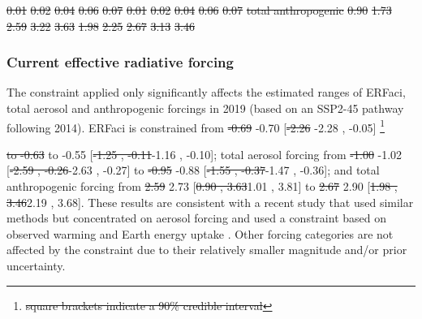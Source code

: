 \documentclass[gmd, manuscript]{copernicus}
\providecommand{\DIFadd}[1]{{\protect\color{blue}#1}} %
\providecommand{\DIFdel}[1]{{\protect\color{red}\sout{#1}}}                      %
\providecommand{\DIFaddbegin}{} %
\providecommand{\DIFaddend}{} %
\providecommand{\DIFdelbegin}{} %
\providecommand{\DIFdelend}{} %
\providecommand{\DIFdelFL}[1]{\DIFdel{#1}} %
\providecommand{\DIFaddbeginFL}{} %
\providecommand{\DIFdelendFL}{} %
\begin{document}
\begin{table}[t]
\DIFdelFL{0.01 }%
\DIFdelFL{0.02 }%
\DIFdelFL{0.04 }%
\DIFdelFL{0.06 }%
\DIFdelFL{0.07 }%
\DIFdelFL{0.01 }%
\DIFdelFL{0.02 }%
\DIFdelFL{0.04 }%
\DIFdelFL{0.06 }%
\DIFdelFL{0.07 }%
\DIFdelFL{total anthropogenic         }%
\DIFdelFL{0.90 }%
\DIFdelFL{1.73 }%
\DIFdelFL{2.59 }%
\DIFdelFL{3.22 }%
\DIFdelFL{3.63 }%
\DIFdelFL{1.98 }%
\DIFdelFL{2.25 }%
\DIFdelFL{2.67 }%
\DIFdelFL{3.13 }%
\DIFdelFL{3.46 }%
\DIFdelendFL \DIFaddbeginFL \end{table}
\clearpage
\DIFaddend \subsubsection{Current effective radiative forcing}
The constraint applied only significantly affects the estimated ranges of ERFaci, total aerosol and anthropogenic forcings in 2019 (based on an SSP2-45 pathway following 2014). ERFaci is constrained from \DIFdelbegin \DIFdel{-0.69 }\DIFdelend \DIFaddbegin \DIFadd{-0.70 }\DIFaddend [\DIFdelbegin \DIFdel{-2.26 }\DIFdelend \DIFaddbegin \DIFadd{-2.28 }\DIFaddend , -0.05] \DIFdelbegin \footnote{\DIFdel{square brackets indicate a 90\% credible interval}} %
\addtocounter{footnote}{-1}%
\DIFdel{to -0.63 }\DIFdelend \DIFaddbegin \DIFadd{to -0.55 }\DIFaddend [\DIFdelbegin \DIFdel{-1.25 , -0.11}\DIFdelend \DIFaddbegin \DIFadd{-1.16 , -0.10}\DIFaddend ]; total aerosol forcing from \DIFdelbegin \DIFdel{-1.00 }\DIFdelend \DIFaddbegin \DIFadd{-1.02 }\DIFaddend [\DIFdelbegin \DIFdel{-2.59 , -0.26}\DIFdelend \DIFaddbegin \DIFadd{-2.63 , -0.27}\DIFaddend ] to \DIFdelbegin \DIFdel{-0.95 }\DIFdelend \DIFaddbegin \DIFadd{-0.88 }\DIFaddend [\DIFdelbegin \DIFdel{-1.55 , -0.37}\DIFdelend \DIFaddbegin \DIFadd{-1.47 , -0.36}\DIFaddend ]; and total anthropogenic forcing from \DIFdelbegin \DIFdel{2.59 }\DIFdelend \DIFaddbegin \DIFadd{2.73 }\DIFaddend [\DIFdelbegin \DIFdel{0.90 , 3.63}\DIFdelend \DIFaddbegin \DIFadd{1.01 , 3.81}\DIFaddend ] to \DIFdelbegin \DIFdel{2.67 }\DIFdelend \DIFaddbegin \DIFadd{2.90 }\DIFaddend [\DIFdelbegin \DIFdel{1.98 , 3.46}\DIFdelend \DIFaddbegin \DIFadd{2.19 , 3.68}\DIFaddend ]. These results are consistent with a recent study that used similar methods but concentrated on aerosol forcing and used a constraint based on observed warming and Earth energy uptake \citep{Smith2020a}. Other forcing categories are not affected by the constraint due to their relatively smaller magnitude and/or prior uncertainty.
%
\end{document}
